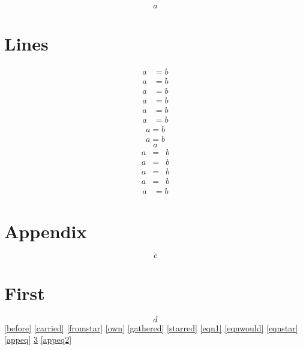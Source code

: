 \documentclass{article}
\numberwithin{equation}{section}
\begin{document}
\begin{equation}a\label{before}\end{equation}
\section{Lines}\label{sec1}
\begin{align}a&=b\\a&=b\nonumber\label{carried}\\a&=b\end{align}
\begin{align*}a&=b\label{fromstar}\end{align*}
\begin{align}a&=b\end{align}
\begin{align}a&=b\label{own}\end{align}
\begin{gather}a=b\nonumber\label{gathered}\\a=b\end{gather}
\begin{equation*}a\label{starred}\end{equation*}
\begin{eqnarray}a&=&b\label{eqn1}\\a&=&b\nonumber\label{eqnwould}\\a&=&b\end{eqnarray}
\begin{eqnarray*}a&=&b\label{eqnstar}\end{eqnarray*}
\begin{align}a&=b\nonumber\label{lost}\end{align}
\section{Appendix}
\appendix
\begin{equation}c\label{appeq}\end{equation}
\section{First}\label{appA}
\begin{equation}d\label{appeq2}\end{equation}
\ref{before} \ref{carried} \ref{fromstar} \ref{own} \ref{gathered} \ref{starred}
\ref{eqn1} \ref{eqnwould} \ref{eqnstar} \ref{appeq} \ref{appA} \ref{appeq2}
\end{document}
